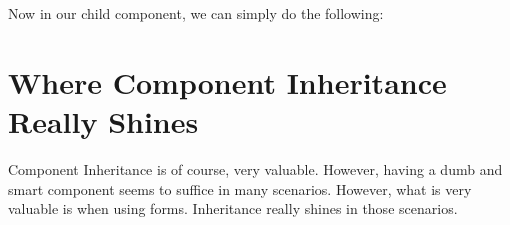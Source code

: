 Now in our child component, we can simply do the following:



\section{ Where Component Inheritance Really Shines }
Component Inheritance is of course, very valuable. However, having a dumb and
smart component seems to suffice in many scenarios. However, what is very
valuable is when using forms. Inheritance really shines in those scenarios. 
